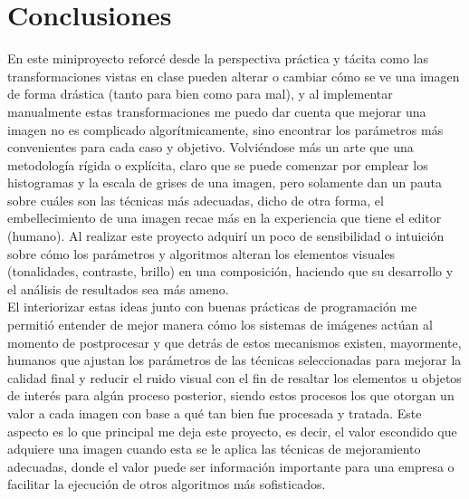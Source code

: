 \section{Conclusiones}
    En este miniproyecto reforcé desde la perspectiva práctica y
    tácita como las transformaciones vistas en clase pueden alterar 
    o cambiar cómo se ve una imagen de forma drástica (tanto para 
    bien como para mal), y al implementar manualmente estas transformaciones 
    me puedo dar cuenta que mejorar una imagen no es complicado 
    algorítmicamente, sino encontrar los parámetros más convenientes para 
    cada caso y objetivo. Volviéndose más un arte que una metodología 
    rígida o explícita, claro que se puede comenzar por emplear los 
    histogramas y la escala de grises de una imagen, pero solamente 
    dan un pauta sobre cuáles son las técnicas más adecuadas, dicho de 
    otra forma, el embellecimiento de una imagen recae más en la 
    experiencia que tiene el editor (humano). Al realizar este proyecto   
    adquirí un poco de sensibilidad o intuición sobre cómo los 
    parámetros y algoritmos alteran los elementos visuales (tonalidades, 
    contraste, brillo) en una composición, haciendo que su desarrollo y 
    el análisis de resultados sea más ameno.\\

    El interiorizar estas ideas junto con buenas prácticas de programación 
    me permitió entender de mejor manera cómo los sistemas de imágenes 
    actúan al momento de postprocesar y que detrás de estos mecanismos 
    existen, mayormente, humanos que ajustan los parámetros de las técnicas 
    seleccionadas para mejorar la calidad final y reducir el ruido 
    visual con el fin de resaltar los elementos u objetos de interés 
    para algún proceso posterior, siendo estos procesos los que otorgan 
    un valor a cada imagen con base a qué tan bien fue procesada y tratada. 
    Este aspecto es lo que principal me deja este proyecto, es decir, 
    el valor escondido que adquiere una imagen cuando esta se le aplica 
    las técnicas de mejoramiento adecuadas, donde el valor puede ser 
    información importante para una empresa o facilitar la ejecución 
    de otros algoritmos más sofisticados.